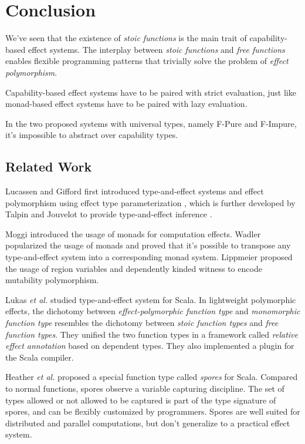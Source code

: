 \section{Conclusion}

We've seen that the existence of \emph{stoic functions} is the main
trait of capability-based effect systems. The interplay between
\emph{stoic functions} and \emph{free functions} enables flexible
programming patterns that trivially solve the problem of \emph{effect
  polymorphism}.

Capability-based effect systems have to be paired with strict
evaluation, just like monad-based effect systems have to be paired
with lazy evaluation.

In the two proposed systems with universal types, namely F-Pure and
F-Impure, it's impossible to abstract over capability types.

\subsection{Related Work}

Lucassen and Gifford first introduced type-and-effect
systems\cite{gifford1986integrating} and effect polymorphism using
effect type parameterization \cite{lucassen1988polymorphic}, which is
further developed by Talpin and Jouvelot to provide type-and-effect
inference \cite{talpin1992polymorphic, talpin1994type}.

Moggi introduced the usage of monads for computation
effects\cite{moggi1991notions}. Wadler popularized the usage of
monads\cite{wadler1992comprehending, wadler1995monads} and proved that
it's possible to transpose any type-and-effect system into a
corresponding monad system\cite{wadler2003marriage}. Lippmeier
proposed the usage of region variables and dependently kinded witness
to encode mutability polymorphism\cite{lippmeier2009witnessing}.

Lukas \emph{et al.}  studied type-and-effect system for
Scala\cite{rytz2012lightweight, rytz2013flow, lukas2014effect}.  In
lightweight polymorphic effects\cite{rytz2012lightweight}, the
dichotomy between \emph{effect-polymorphic function type} and
\emph{monomorphic function type} resembles the dichotomy between
\emph{stoic function types} and \emph{free function types}.  They
unified the two function types in a framework called \emph{relative
  effect annotation} based on dependent types. They also implemented a
plugin for the Scala compiler.

Heather \emph{et al.} proposed a special function type called
\emph{spores} for Scala\cite{miller2014spores}. Compared to normal
functions, spores observe a variable capturing discipline. The set of
types allowed or not allowed to be captured is part of the type
signature of spores, and can be flexibly customized by
programmers. Spores are well suited for distributed and parallel
computations, but don't generalize to a practical effect system.

